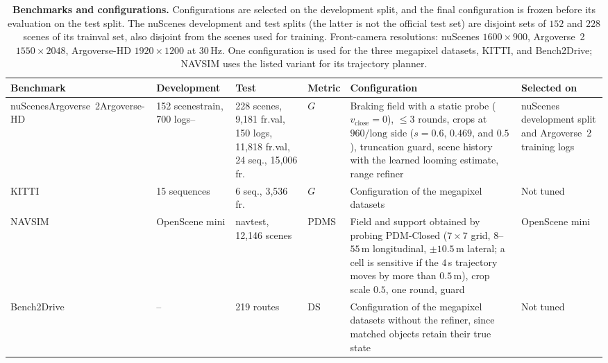 \documentclass[10pt,letterpaper]{article}
\renewcommand{\arraystretch}{1.08}
\newcommand{\G}{G}
\newcommand{\vclose}{v_{\mathrm{close}}}
\newcommand{\na}{--}
\theoremstyle{remark}
\theoremstyle{plain}
\theoremstyle{definition}
\begin{document}
\begin{table}[!htbp]
\centering
\caption{\textbf{Benchmarks and configurations.} Configurations are selected on the development split, and the final configuration is frozen before its evaluation on the test split. The nuScenes development and test splits (the latter is not the official test set) are disjoint sets of $152$ and $228$ scenes of its trainval set, also disjoint from the scenes used for training. Front-camera resolutions: nuScenes $1600\times900$, Argoverse~2 $1550\times2048$, Argoverse-HD $1920\times1200$ at $30$\,Hz. One configuration is used for the three megapixel datasets, KITTI, and Bench2Drive; NAVSIM uses the listed variant for its trajectory planner.}
\label{tab:benchmarks}
\small
\setlength{\tabcolsep}{4pt}
\renewcommand{\arraystretch}{1.15}
\begin{tabular}{@{}p{1.9cm}p{2.2cm}p{3.3cm}lp{4.8cm}p{1.9cm}@{}}
\toprule
Benchmark & Development & Test & Metric & Configuration & Selected on \\
\midrule
nuScenes\newline Argoverse~2\newline Argoverse-HD & 152 scenes\newline train, 700 logs\newline \na & 228 scenes, 9{,}181 fr.\newline val, 150 logs, 11{,}818 fr.\newline val, 24 seq., 15{,}006 fr. & $\G$ & Braking field with a static probe ($\vclose=0$), $\le3$ rounds, crops at $960/\text{long side}$ ($s=0.6$, $0.469$, and $0.5$), truncation guard, scene history with the learned looming estimate, range refiner & nuScenes development split and Argoverse~2 training logs \\
\midrule
KITTI & 15 sequences & 6 seq., 3{,}536 fr. & $\G$ & Configuration of the megapixel datasets & Not tuned \\
NAVSIM & OpenScene mini & navtest, 12{,}146 scenes & PDMS & Field and support obtained by probing PDM-Closed ($7\times7$ grid, $8$--$55$\,m longitudinal, $\pm10.5$\,m lateral; a cell is sensitive if the $4$\,s trajectory moves by more than $0.5$\,m), crop scale $0.5$, one round, guard & OpenScene mini \\
Bench2Drive & \na & 219 routes & DS & Configuration of the megapixel datasets without the refiner, since matched objects retain their true state & Not tuned \\
\bottomrule
\end{tabular}
\end{table}
\end{document}
